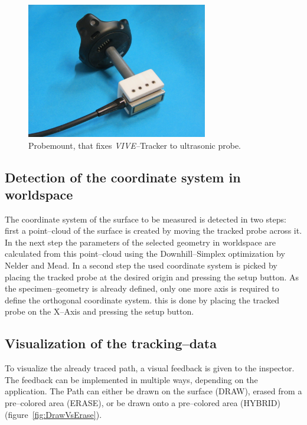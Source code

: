 \documentclass{VRARWorkshop}
\begin{document}
\begin{figure}[h!]
  \label{fig:probemount}
    \begin{center}
        \includegraphics[width=79mm]{images/probemount}
        \caption{\label{fig:probemount} Probemount, that fixes \textit{VIVE--}Tracker to ultrasonic probe.}
    \end{center}
\end{figure}

\subsection{Detection of the coordinate system in worldspace}
The coordinate system of the surface to be measured is detected in two steps:
first a point--cloud of the surface is created by moving the tracked probe across it.
In the next step the parameters of the selected geometry in worldspace are calculated from this point--cloud using the Downhill--Simplex optimization by Nelder and Mead.
In a second step the used coordinate system is picked by placing the tracked probe at the desired origin and pressing the setup button.
As the specimen--geometry is already defined, only one more axis is required to define the orthogonal coordinate system.
this is done by placing the tracked probe on the X--Axis and pressing the setup button.

\subsection{Visualization of the tracking--data}
\label{sec:DrawVsErase}
To visualize the already traced path, a visual feedback is given to the inspector.
The feedback can be implemented in multiple ways, depending on the application.
The Path can either be drawn on the surface (DRAW), erased from a pre--colored area (ERASE), or be drawn onto a pre--colored area (HYBRID) (figure~\ref{fig:DrawVsErase}).
\end{document}

